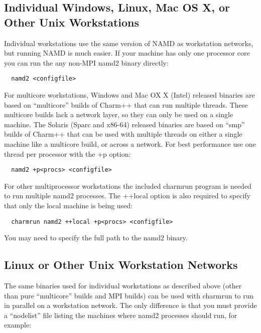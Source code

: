\subsection{Individual Windows, Linux, Mac OS X, or Other Unix Workstations}

Individual workstations use the same version of NAMD as workstation
networks, but running NAMD is much easier.  If your machine has only
one processor core you can run the any non-MPI namd2 binary directly:

\begin{verbatim}
  namd2 <configfile>
\end{verbatim}

For multicore workstations, Windows and Mac OX X (Intel) released binaries
are based on ``multicore'' builds of Charm++ that can run multiple threads.
These multicore builds lack a network layer, so they can only be used on a
single machine.
The Solaris (Sparc and x86-64) released binaries are based on ``smp''
builds of Charm++ that can be used with multiple threads on either a
single machine like a multicore build, or across a network.
For best performance use one thread per processor with the +p option:

\begin{verbatim}
  namd2 +p<procs> <configfile>
\end{verbatim}

For other multiprocessor workstations the included charmrun program is
needed to run multiple namd2 processes.  The ++local option is also
required to specify that only the local machine is being used:

\begin{verbatim}
  charmrun namd2 ++local +p<procs> <configfile>
\end{verbatim}

You may need to specify the full path to the namd2 binary.

\subsection{Linux or Other Unix Workstation Networks}

The same binaries used for individual workstations as described above
(other than pure ``multicore'' builds and MPI builds)
can be used with charmrun to run in parallel on a workstation network.
The only difference is that you must provide a ``nodelist'' file listing
the machines where namd2 processes should run, for example:

